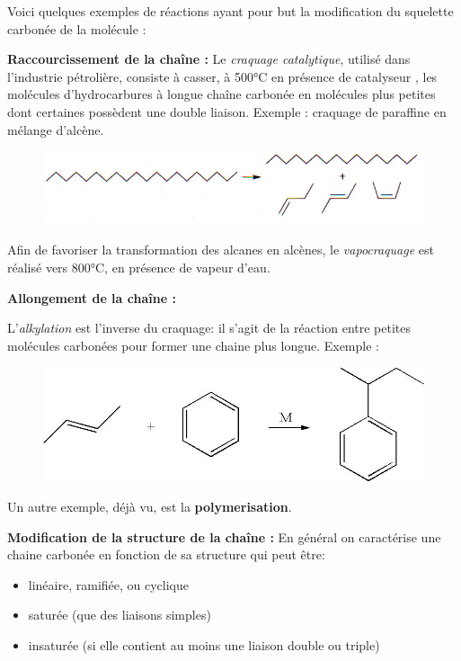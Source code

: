 \documentclass[11pt,a4paper]{article}
\begin{document}
Voici quelques exemples de réactions ayant pour but la modification du squelette carbonée de la molécule : 

\textbf{Raccourcissement de la chaîne :} 
Le \textit{craquage catalytique}, utilisé dans l’industrie pétrolière, consiste à casser, à 500°C en présence de catalyseur , les molécules d’hydrocarbures à longue chaîne carbonée en molécules plus petites dont certaines possèdent une double liaison. Exemple : craquage de paraffine en mélange d’alcène. 

\begin{figure}[h]
    \centering
    \includegraphics[width=0.8\linewidth]{imgs/c5/craquage.jpg}
\end{figure}

Afin de favoriser la transformation des alcanes en alcènes, le \textit{vapocraquage} est réalisé vers 800°C, en présence de vapeur d’eau.  

\textbf{Allongement de la chaîne : }

L'\textit{alkylation} est l’inverse du craquage: il s’agit de la réaction entre petites molécules carbonées pour former une chaine plus longue. Exemple : 
\begin{figure}[h]
    \centering
    \includegraphics[width=0.8\linewidth]{imgs/c5/alkylation.jpg}
\end{figure}

Un autre exemple, déjà vu, est la \textbf{polymerisation}. 

\textbf{Modification de la structure de la chaîne : }
En général on caractérise une chaine carbonée en fonction de sa structure qui peut être: \begin{itemize}
    \item linéaire, ramifiée, ou cyclique
    \item saturée (que des liaisons simples)
    \item insaturée (si elle contient au moins une liaison double ou triple)
\end{itemize}
	
\end{document}

